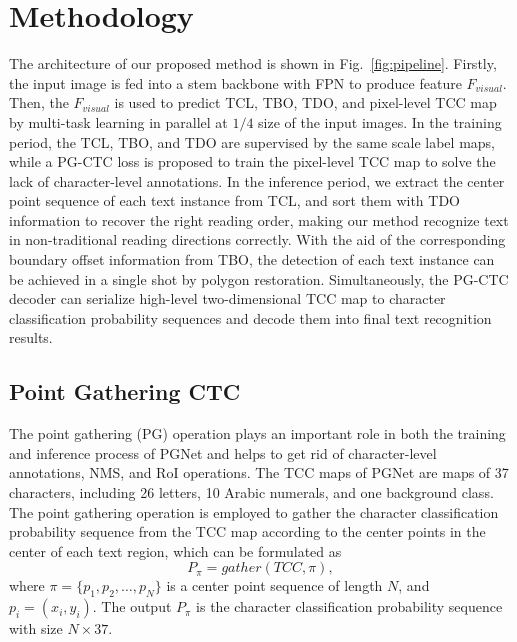 \documentclass[letterpaper]{article} \usepackage{aaai21}  \usepackage{times}  \usepackage{helvet} \usepackage{courier}  \usepackage[hyphens]{url}  \usepackage{graphicx} \urlstyle{rm} \def\UrlFont{\rm}  \usepackage{natbib}  \usepackage{caption} \usepackage{bm}
\begin{document}
\section{Methodology}
The architecture of our proposed method is shown in Fig.~\ref{fig:pipeline}. Firstly, the input image is fed into a stem backbone with FPN to produce feature $F_{visual}$. Then, the $F_{visual}$ is used to predict TCL, TBO, TDO, and pixel-level TCC map by multi-task learning in parallel at $1/4$ size of the input images. In the training period, the TCL, TBO, and TDO are supervised by the same scale label maps, while a PG-CTC loss is proposed to train the pixel-level TCC map to solve the lack of character-level annotations. In the inference period, we extract the center point sequence of each text instance from TCL, and sort them with TDO information to recover the right reading order, making our method recognize text in non-traditional reading directions correctly.
With the aid of the corresponding boundary offset information from TBO, the detection of each text instance can be achieved in a single shot by polygon restoration. Simultaneously, the PG-CTC decoder can serialize high-level two-dimensional TCC map to character classification probability sequences and decode them into final text recognition results.

\subsection{Point Gathering CTC}
\label{sect_PG}
The point gathering (PG) operation plays an important role in both the training and inference process of PGNet and helps to get rid of character-level annotations, NMS, and RoI operations. The TCC maps of PGNet are maps of 37 characters, including 26 letters, 10 Arabic numerals, and one background class. The point gathering operation is employed to gather the character classification probability sequence from the TCC map according to the center points in the center of each text region, which can be formulated as
\begin{equation}
    P_{\pi} = gather(TCC, \pi),
    \label{eq_gather}
\end{equation}
where $\pi = \{ p_1, p_2, \dots, p_N \}$ is a center point sequence of length $N$, and $p_i = (x_i, y_i)$.  The output $P_{\pi}$ is the character classification probability sequence with size $N \times 37$.
\end{document}
